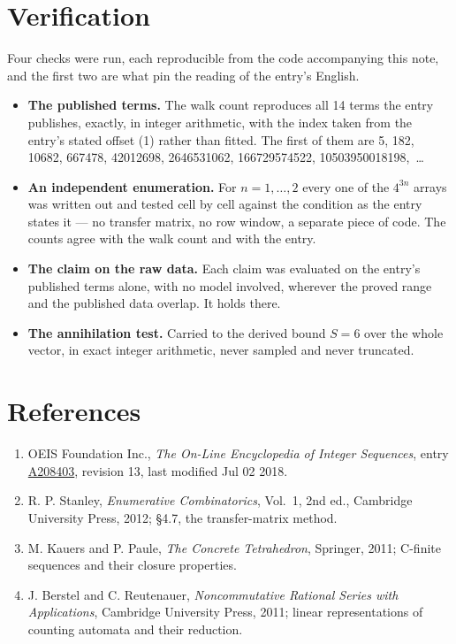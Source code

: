 \documentclass[11pt]{article}
\theoremstyle{definition}
\begin{document}
\section{Verification}

Four checks were run, each reproducible from the code accompanying this note, and the first two are what pin the reading of the entry's English.

\begin{itemize}

\item {\bfseries The published terms.} The walk count reproduces all 14 terms the entry publishes, exactly, in integer arithmetic, with the index taken from the entry's stated offset (1) rather than fitted. The first of them are 5, 182, 10682, 667478, 42012698, 2646531062, 166729574522, 10503950018198,~\dots

\item {\bfseries An independent enumeration.} For $n = 1,\dots,2$ every one of the $4^{3n}$ arrays was written out and tested cell by cell against the condition as the entry states it --- no transfer matrix, no row window, a separate piece of code. The counts agree with the walk count and with the entry.

\item {\bfseries The claim on the raw data.} Each claim was evaluated on the entry's published terms alone, with no model involved, wherever the proved range and the published data overlap. It holds there.

\item {\bfseries The annihilation test.} Carried to the derived bound $S = 6$ over the whole vector, in exact integer arithmetic, never sampled and never truncated.

\end{itemize}

\section{References}

\begin{enumerate}

\item OEIS Foundation Inc., \emph{The On-Line Encyclopedia of Integer Sequences}, entry \href{https://oeis.org/A208403}{A208403}, revision 13, last modified Jul 02 2018.

\item R. P. Stanley, \emph{Enumerative Combinatorics}, Vol.~1, 2nd ed., Cambridge University Press, 2012; \S4.7, the transfer-matrix method.

\item M. Kauers and P. Paule, \emph{The Concrete Tetrahedron}, Springer, 2011; C-finite sequences and their closure properties.

\item J. Berstel and C. Reutenauer, \emph{Noncommutative Rational Series with Applications}, Cambridge University Press, 2011; linear representations of counting automata and their reduction.

\end{enumerate}
\end{document}

